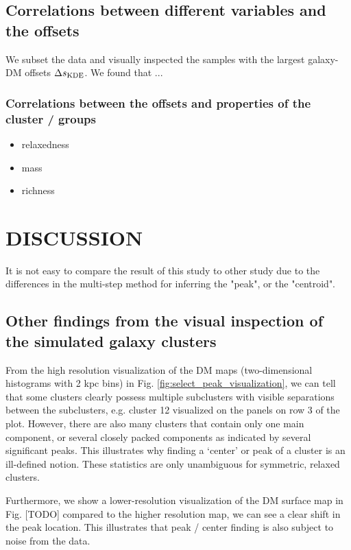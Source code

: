 \subsection{Correlations between different variables and the offsets}
We subset the data and visually inspected the samples with the largest galaxy-DM
offsets $\Delta s_{\rm KDE}$. We found that ...  

\subsubsection{Correlations between the offsets and properties of the 
cluster / groups}
\begin{itemize}
\item relaxedness
\item mass 
\item richness  
\end{itemize}



\section{DISCUSSION}\label{sec:discussion}
It is not easy to compare the result of this study to other study due to the 
differences in the multi-step method for inferring the "peak", or the
"centroid".

\subsection{Other findings from the visual inspection of the simulated galaxy clusters}
From the high resolution visualization of the DM maps (two-dimensional
histograms with 2 kpc bins) in 
Fig. \ref{fig:select_peak_visualization}, we can tell that some clusters clearly
possess multiple subclusters with visible separations between the subclusters, e.g. cluster 12 visualized on the panels on row 3 
of the plot. 
However, there are also many clusters that contain  
only one main component, or several closely packed components as indicated by
several significant peaks. 
This illustrates why finding a `center' or peak of a cluster is an ill-defined 
notion. These statistics are only unambiguous for symmetric, relaxed 
clusters.  

Furthermore, we show a lower-resolution visualization of the DM surface
map in Fig. [TODO] compared to the higher resolution map, we can see a clear
shift in the peak location. This illustrates that peak / center finding is also
subject to noise from the data.


